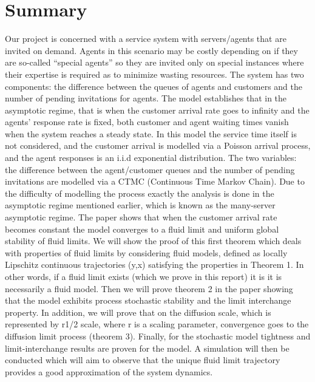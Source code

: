 	\section{Summary}
Our project is concerned with a service system with servers/agents that are invited on demand. Agents in this scenario may be costly depending on if they are so-called “special agents” so they are invited only on special instances where their expertise is required as to minimize wasting resources. The system has two components: the difference between the queues of agents and customers and the number of pending invitations for agents. The model establishes that in the asymptotic regime, that is when the customer arrival rate goes to infinity and the agents’ response rate is fixed, both customer and agent waiting times vanish when the system reaches a steady state. In this model the service time itself is not considered, and the customer arrival is modelled via a Poisson arrival process, and the agent responses is an i.i.d exponential distribution. The two variables: the difference between the agent/customer queues and the number of pending invitations are modelled via a CTMC (Continuous Time Markov Chain). Due to the difficulty of modelling the process exactly the analysis is done in the asymptotic regime mentioned earlier, which is known as the many-server asymptotic regime. The paper shows that when the customer arrival rate becomes constant the model converges to a fluid limit and uniform global stability of fluid limits. We will show the proof of this first theorem which deals with properties of fluid limits by considering fluid models, defined as locally Lipschitz continuous trajectories (y,x) satisfying the properties in Theorem 1. In other words, if a fluid limit exists (which we prove in this report) it is it is necessarily a fluid model. Then we will prove theorem 2 in the paper showing that the model exhibits process stochastic stability and the limit interchange property. In addition, we will prove that on the diffusion scale, which is represented by r1/2 scale, where r is a scaling parameter, convergence goes to the diffusion limit process  (theorem 3).  Finally, for the stochastic model tightness and limit-interchange results are proven for the model. A simulation will then be conducted which will aim to observe that the unique fluid limit trajectory provides a good approximation of the system dynamics.

	\maketitle

